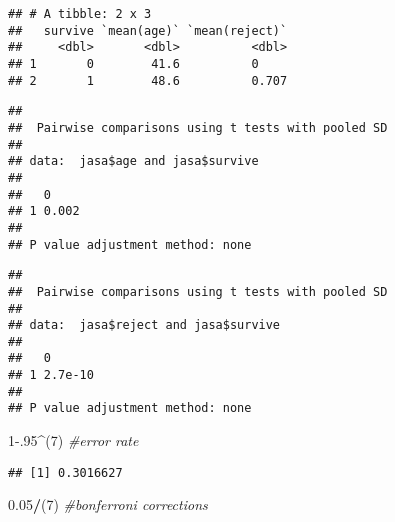 \documentclass[]{article}
\newenvironment{Shaded}{\begin{snugshade}}{\end{snugshade}}
\newcommand{\CommentTok}[1]{\textcolor[rgb]{0.56,0.35,0.01}{\textit{#1}}}
\newcommand{\DataTypeTok}[1]{\textcolor[rgb]{0.13,0.29,0.53}{#1}}
\newcommand{\DecValTok}[1]{\textcolor[rgb]{0.00,0.00,0.81}{#1}}
\newcommand{\FloatTok}[1]{\textcolor[rgb]{0.00,0.00,0.81}{#1}}
\newcommand{\KeywordTok}[1]{\textcolor[rgb]{0.13,0.29,0.53}{\textbf{#1}}}
\newcommand{\NormalTok}[1]{#1}
\newcommand{\OperatorTok}[1]{\textcolor[rgb]{0.81,0.36,0.00}{\textbf{#1}}}
\newcommand{\StringTok}[1]{\textcolor[rgb]{0.31,0.60,0.02}{#1}}
\begin{document}
\begin{verbatim}
## # A tibble: 2 x 3
##   survive `mean(age)` `mean(reject)`
##     <dbl>       <dbl>          <dbl>
## 1       0        41.6          0    
## 2       1        48.6          0.707
\end{verbatim}

\begin{Shaded}
\end{Shaded}

\begin{verbatim}
## 
##  Pairwise comparisons using t tests with pooled SD 
## 
## data:  jasa$age and jasa$survive 
## 
##   0    
## 1 0.002
## 
## P value adjustment method: none
\end{verbatim}

\begin{Shaded}
\end{Shaded}

\begin{verbatim}
## 
##  Pairwise comparisons using t tests with pooled SD 
## 
## data:  jasa$reject and jasa$survive 
## 
##   0      
## 1 2.7e-10
## 
## P value adjustment method: none
\end{verbatim}

\begin{Shaded}
\begin{Highlighting}[]
\DecValTok{1}\FloatTok{-.95}\OperatorTok{^}\NormalTok{(}\DecValTok{7}\NormalTok{) }\CommentTok{#error rate}
\end{Highlighting}
\end{Shaded}

\begin{verbatim}
## [1] 0.3016627
\end{verbatim}

\begin{Shaded}
\begin{Highlighting}[]
\FloatTok{0.05}\OperatorTok{/}\NormalTok{(}\DecValTok{7}\NormalTok{) }\CommentTok{#bonferroni corrections}
\end{Highlighting}
\end{Shaded}
\end{document}
